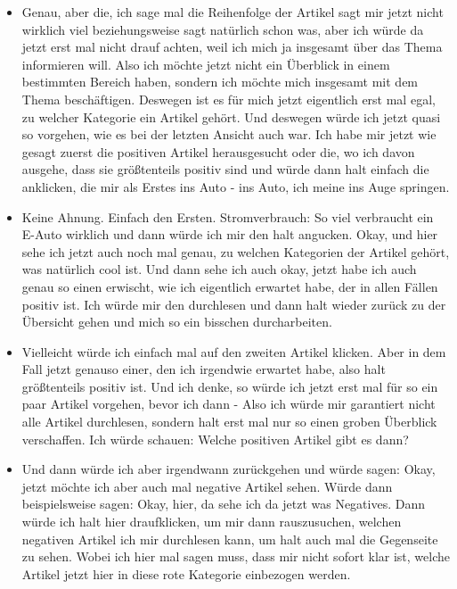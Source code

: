 {\begin{itemize}[]
    \item {} Genau, aber die, ich sage mal die Reihenfolge der Artikel sagt mir jetzt nicht wirklich viel beziehungsweise sagt natürlich schon was, aber ich würde da jetzt erst mal nicht drauf achten, weil ich mich ja insgesamt über das Thema informieren will.
    Also ich möchte jetzt nicht ein Überblick in einem bestimmten Bereich haben, sondern ich möchte mich insgesamt mit dem Thema beschäftigen.
    Deswegen ist es für mich jetzt eigentlich erst mal egal, zu welcher Kategorie ein Artikel gehört.
    Und deswegen würde ich jetzt quasi so vorgehen, wie es bei der letzten Ansicht auch war. 
    Ich habe mir jetzt wie gesagt zuerst die positiven Artikel herausgesucht oder die, wo ich davon ausgehe, dass sie größtenteils positiv sind und würde dann halt einfach die anklicken, die mir als Erstes ins Auto - ins Auto, ich meine ins Auge springen.
    \item {} Keine Ahnung.
    Einfach den Ersten. 
    \flqq Stromverbrauch: So viel verbraucht ein E-Auto wirklich\frqq{} und dann würde ich mir den halt angucken.
    Okay, und hier sehe ich jetzt auch noch mal genau, zu welchen Kategorien der Artikel gehört, was natürlich cool ist.
    Und dann sehe ich auch okay, jetzt habe ich auch genau so einen erwischt, wie ich eigentlich erwartet habe, der in allen Fällen positiv ist.
    Ich würde mir den durchlesen und dann halt wieder zurück zu der Übersicht gehen und mich so ein bisschen durcharbeiten.
    \item {} Vielleicht würde ich einfach mal auf den zweiten Artikel klicken.
    Aber in dem Fall jetzt genauso einer, den ich irgendwie erwartet habe, also halt größtenteils positiv ist.
    Und ich denke, so würde ich jetzt erst mal für so ein paar Artikel vorgehen, bevor ich dann - Also ich würde mir garantiert nicht alle Artikel durchlesen, sondern halt erst mal nur so einen groben Überblick verschaffen.
    Ich würde schauen: Welche positiven Artikel gibt es dann?
    \item {} Und dann würde ich aber irgendwann zurückgehen und würde sagen: Okay, jetzt möchte ich aber auch mal negative Artikel sehen.
    Würde dann beispielsweise sagen: Okay, hier, da sehe ich da jetzt was Negatives.
    Dann würde ich halt hier draufklicken, um mir dann rauszusuchen, welchen negativen Artikel ich mir durchlesen kann, um halt auch mal die Gegenseite zu sehen.
    Wobei ich hier mal sagen muss, dass mir nicht sofort klar ist, welche Artikel jetzt hier in diese rote Kategorie einbezogen werden.

\end{itemize}}
